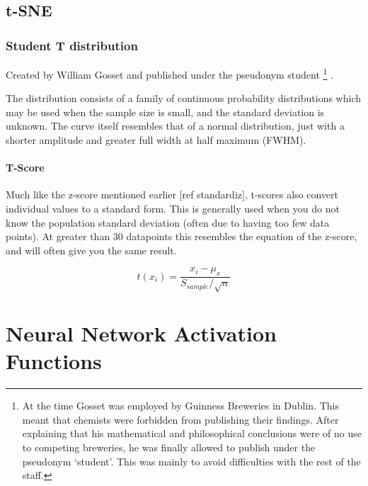 \section {t-SNE} \label{appendix:tsne}

\subsection{Student T distribution}

Created by William Gosset and published under the pseudonym student \footnote{ At the time Gosset was employed by Guinness Breweries in Dublin. This meant that chemists were forbidden from publishing their findings. After explaining that his mathematical and philosophical conclusions were of no use to competing breweries, he was finally allowed to publish under the pseudonym `student'. This was mainly to avoid difficulties with the rest of the staff.} \cite{student}.

The distribution consists of a family of continuous probability distributions which may be used when the sample size is small, and the standard deviation is unknown. The curve itself resembles that of a normal distribution, just with a shorter amplitude and greater full width at half maximum (FWHM).


\subsubsection{T-Score}
Much like the z-score mentioned earlier [ref standardiz], t-scores also convert individual values to a standard form. This is generally used when you do not know the population standard deviation (often due to having too few data points). At greater than 30 datapoints this resembles the equation of the z-score, and will often give you the same result.


\begin{equation}
    t(x_i) = \frac{x_i - \mu_x}{S_{sample}/\sqrt{n} }
    \label{eqn:t}
\end{equation}
%
%


\chapter{Neural Network Activation Functions}\label{appendix:activation}


